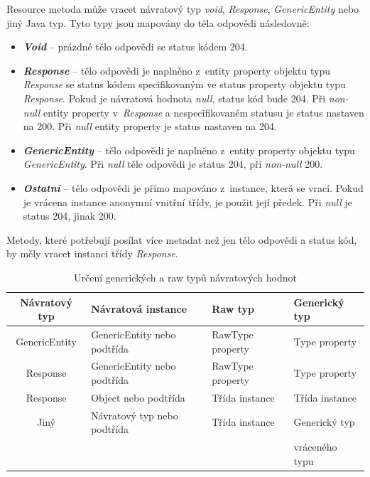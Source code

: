 \documentclass[11pt,twoside,a4paper]{book}
\begin{document}
Resource metoda může vracet návratový typ {\em void}, {\em Response},
{\em GenericEntity} nebo jiný Java typ. Tyto typy jsou mapovány do těla odpovědi
následovně:

\begin{itemize}
  \item \textbf{\textit{Void}} – prázdné tělo odpovědi se status kódem 204.
  \item \textbf{\textit{Response}} – tělo odpovědi je naplněno z~entity
  property objektu typu {\em Response} se status kódem specifikovaným ve status property objektu typu {\em Response}. Pokud je
návratová hodnota {\em null}, status kód bude 204. Při {\em non-null} entity
property v~{\em Response} a nespecifikovaném statusu je status nastaven na 200.
Při {\em null} entity property je status nastaven na 204.
  \item \textbf{\textit{GenericEntity}} – tělo odpovědi je naplněno
  z~entity property objektu typu {\em GenericEntity}. Při {\em null} těle
  odpovědi je status 204, při {\em non-null} 200.
  \item \textbf{\textit{Ostatní}} – tělo odpovědi je přímo mapováno
z~instance, která se vrací.
Pokud je vrácena instance anonymní vnitřní třídy, je použit její předek. Při
{\em null} je status 204, jinak 200.
\end{itemize}

Metody, které potřebují posílat více metadat než jen tělo odpovědi a status kód, by měly
vracet instanci třídy {\em Response}.

\begin{table}
\begin{center}
\begin{tabular}{|c|l|l|l|}
\hline
\textbf{Návratový typ} & \textbf{Návratová instance} & \textbf{Raw typ} &
\textbf{Generický typ} \\
\hline
GenericEntity & GenericEntity nebo podtřída & RawType property & Type property \\
\hline
Response & GenericEntity nebo podtřída & RawType property & Type property \\
\hline
Response & Object nebo podtřída  & Třída instance & Třída instance \\
\hline
Jiný & Návratový typ nebo podtřída  & Třída instance & Generický typ \\
&&&  vráceného typu \\
\hline
\end{tabular}
\end{center}
\caption{Určení generických a raw typů návratových hodnot}
\label{tab:genericke-a-raw-typy}
\end{table}
\end{document}
